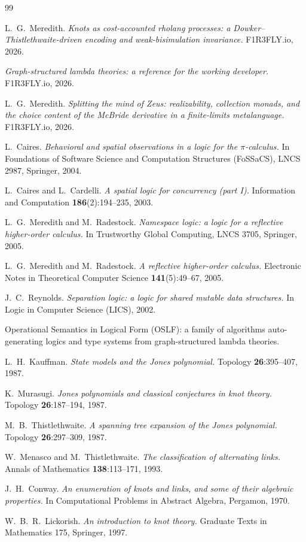\documentclass[11pt]{article}
\theoremstyle{definition}
\begin{document}
\begin{thebibliography}{99}

 L.~G.~Meredith. \emph{Knots as cost-accounted rholang processes: a
  Dowker--Thistlethwaite-driven encoding and weak-bisimulation invariance.}
  F1R3FLY.io, 2026.

 \emph{Graph-structured lambda theories: a reference for the
  working developer.} F1R3FLY.io, 2026.

 L.~G.~Meredith. \emph{Splitting the mind of Zeus:
  realizability, collection monads, and the choice content of the McBride
  derivative in a finite-limits metalanguage.} F1R3FLY.io, 2026.

 L.~Caires. \emph{Behavioral and spatial observations in a logic
  for the $\pi$-calculus.} In Foundations of Software Science and Computation
  Structures (FoSSaCS), LNCS 2987, Springer, 2004.

 L.~Caires and L.~Cardelli. \emph{A spatial logic for
  concurrency (part I).} Information and Computation \textbf{186}(2):194--235,
  2003.

 L.~G.~Meredith and M.~Radestock. \emph{Namespace logic: a
  logic for a reflective higher-order calculus.} In Trustworthy Global Computing,
  LNCS 3705, Springer, 2005.

 L.~G.~Meredith and M.~Radestock. \emph{A reflective higher-order
  calculus.} Electronic Notes in Theoretical Computer Science
  \textbf{141}(5):49--67, 2005.

 J.~C.~Reynolds. \emph{Separation logic: a logic for shared
  mutable data structures.} In Logic in Computer Science (LICS), 2002.

 Operational Semantics in Logical Form (OSLF): a family of
  algorithms auto-generating logics and type systems from graph-structured lambda
  theories.

 L.~H.~Kauffman. \emph{State models and the Jones polynomial.}
  Topology \textbf{26}:395--407, 1987.

 K.~Murasugi. \emph{Jones polynomials and classical conjectures
  in knot theory.} Topology \textbf{26}:187--194, 1987.

 M.~B.~Thistlethwaite. \emph{A spanning tree expansion of
  the Jones polynomial.} Topology \textbf{26}:297--309, 1987.

 W.~Menasco and M.~Thistlethwaite. \emph{The classification of
  alternating links.} Annals of Mathematics \textbf{138}:113--171, 1993.

 J.~H.~Conway. \emph{An enumeration of knots and links, and some
  of their algebraic properties.} In Computational Problems in Abstract Algebra,
  Pergamon, 1970.

 W.~B.~R.~Lickorish. \emph{An introduction to knot theory.}
  Graduate Texts in Mathematics 175, Springer, 1997.

\end{thebibliography}
\end{document}
